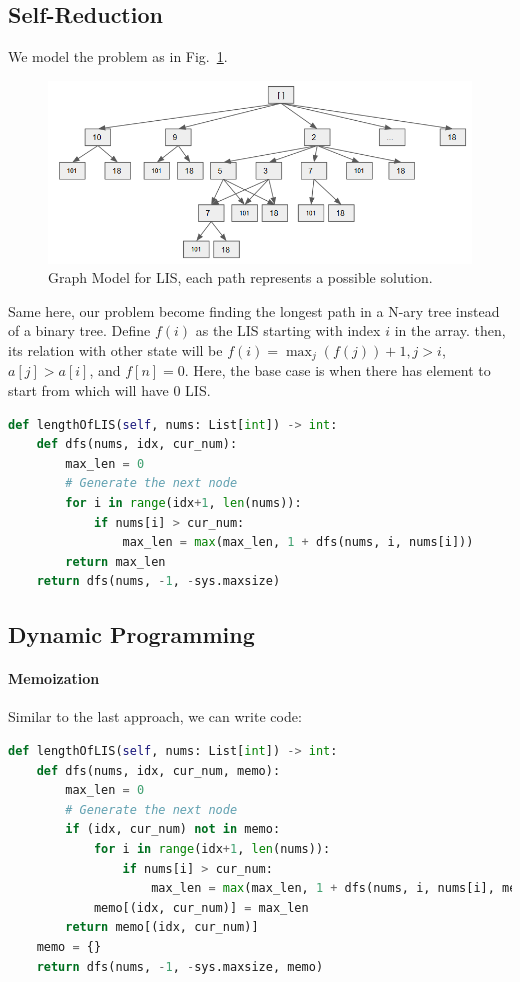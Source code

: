 \documentclass[../main.tex]{subfiles}
\begin{document}
\subsection{Self-Reduction} 
We model the problem as in Fig.~\ref{fig:tree_lis}. 
\begin{figure}[h]
    \centering
    \includegraphics[width=0.8\columnwidth]{fig/LIS_tree.png}
    \caption{Graph Model for LIS, each path represents a possible solution. %
    }
    \label{fig:tree_lis}
\end{figure}
Same here, our problem become finding the longest path in a N-ary tree instead of a binary tree. Define $f(i)$ as the LIS starting with index $i$ in the array. then, its relation with other state will be $f(i) = \max_j(f(j))+1, j>i$, $a[j]>a[i]$, and $f[n]=0$. Here, the base case is when there has element to start from which will have 0 LIS. 
\begin{lstlisting}[language=Python]
def lengthOfLIS(self, nums: List[int]) -> int:
    def dfs(nums, idx, cur_num):
        max_len = 0
        # Generate the next node
        for i in range(idx+1, len(nums)):
            if nums[i] > cur_num:
                max_len = max(max_len, 1 + dfs(nums, i, nums[i]))
        return max_len
    return dfs(nums, -1, -sys.maxsize)
\end{lstlisting}
\subsection{Dynamic Programming} 
\paragraph{Memoization} Similar to the last approach, we can write code:
\begin{lstlisting}[language=Python]
def lengthOfLIS(self, nums: List[int]) -> int:
    def dfs(nums, idx, cur_num, memo):
        max_len = 0
        # Generate the next node
        if (idx, cur_num) not in memo:
            for i in range(idx+1, len(nums)):
                if nums[i] > cur_num:
                    max_len = max(max_len, 1 + dfs(nums, i, nums[i], memo))
            memo[(idx, cur_num)] = max_len
        return memo[(idx, cur_num)]
    memo = {}
    return dfs(nums, -1, -sys.maxsize, memo)
\end{lstlisting}
\end{document}
